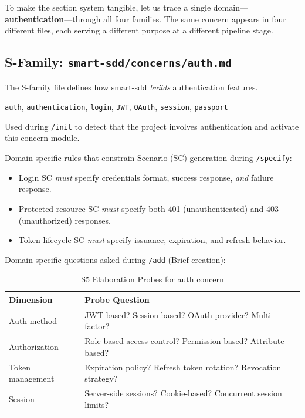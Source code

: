 \documentclass[11pt,a4paper,openright,twoside]{report}
\newcommand{\cmd}[1]{\texttt{/#1}}
\newcommand{\file}[1]{\texttt{#1}}
\begin{document}
To make the section system tangible, let us trace a single domain---\textbf{authentication}---through all four families. The same concern appears in four different files, each serving a different purpose at a different pipeline stage.

\subsection{S-Family: \file{smart-sdd/concerns/auth.md}}

The S-family file defines how smart-sdd \emph{builds} authentication features.

\begin{description}[style=nextline, leftmargin=1.8cm, labelwidth=1.4cm]
  \item[S0 --- Signal Keywords] \texttt{auth}, \texttt{authentication}, \texttt{login}, \texttt{JWT}, \texttt{OAuth}, \texttt{session}, \texttt{passport}

  Used during \cmd{init} to detect that the project involves authentication and activate this concern module.

  \item[S1 --- SC Generation Rules]
  Domain-specific rules that constrain Scenario (SC) generation during \cmd{specify}:
  \begin{itemize}[nosep]
    \item Login SC \emph{must} specify credentials format, success response, \emph{and} failure response.
    \item Protected resource SC \emph{must} specify both 401 (unauthenticated) and 403 (unauthorized) responses.
    \item Token lifecycle SC \emph{must} specify issuance, expiration, and refresh behavior.
  \end{itemize}

  \item[S5 --- Elaboration Probes]
  Domain-specific questions asked during \cmd{add} (Brief creation):
\end{description}

\begin{table}[H]
\centering
\caption{S5 Elaboration Probes for auth concern}
\label{tab:auth-s5-probes}
\begin{tabularx}{\textwidth}{lX}
\toprule
\textbf{Dimension} & \textbf{Probe Question} \\
\midrule
Auth method    & JWT-based? Session-based? OAuth provider? Multi-factor? \\
Authorization  & Role-based access control? Permission-based? Attribute-based? \\
Token management & Expiration policy? Refresh token rotation? Revocation strategy? \\
Session        & Server-side sessions? Cookie-based? Concurrent session limits? \\
\bottomrule
\end{tabularx}
\end{table}
\end{document}

